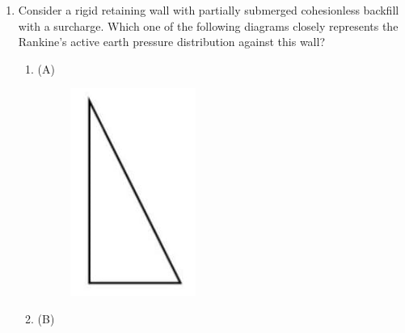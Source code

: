 \documentclass[journal,12pt,onecolumn]{article}
\theoremstyle{remark}
\begin{document}
\begin{enumerate}
    \item Consider a rigid retaining wall with partially submerged cohesionless backfill with a surcharge. Which one of the following diagrams closely represents the Rankine's active earth pressure distribution against this wall?
    \begin{multicols}{4}
    \begin{enumerate}
        \item (A) 
         \begin{figure}[H]
    \centering
    \includegraphics[width=0.7\columnwidth]{image7a.jpg}  
    \caption{}
    \label{fig:1}
    \end{figure}
        \item (B) 
         \begin{figure}[H]
    \centering

\end{figure}
\end{enumerate}
\end{multicols}
\end{enumerate}
\end{document}
